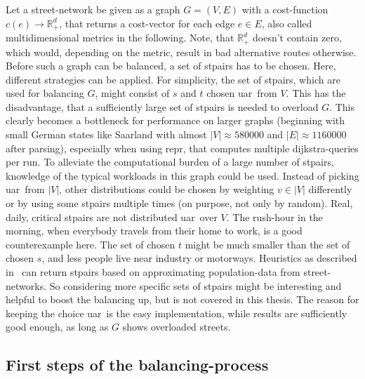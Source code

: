         Let a street-network be given as a graph $G = (V, E)$ with a cost-function $c(e) \rightarrow \mathbb{R}_+^d$, that returns a cost-vector for each edge $e \in E$, also called multidimensional \glspl{metric} in the following.
        Note, that $\mathbb{R}_+^d$ doesn't contain zero, which would, depending on the \gls{metric}, result in bad alternative routes otherwise.
        Before such a graph can be balanced, a set of \glspl{stpair} has to be chosen.
        Here, different strategies can be applied.
        For simplicity, the set of \glspl{stpair}, which are used for balancing $G$, might consist of $s$ and $t$ chosen \gls{uar}\ from $V$.
        This has the disadvantage, that a sufficiently large set of \glspl{stpair} is needed to overload $G$.
        This clearly becomes a bottleneck for performance on larger graphs (beginning with small German states like Saarland with almost $|V| \approx \num{580000}$ and $|E| \approx \num{1160000}$ after parsing), especially when using \gls{repr}, that computes multiple \gls{dijkstra}-queries per run.
        To alleviate the computational burden of a large number of \glspl{stpair}, knowledge of the typical workloads in this graph could be used.
        Instead of picking \gls{uar}\ from $|V|$, other distributions could be chosen by weighting $v \in |V|$ differently or by using some \glspl{stpair} multiple times (on purpose, not only by random).
        Real, daily, critical \glspl{stpair} are not distributed \gls{uar}\ over $V$.
        The rush-hour in the morning, when everybody travels from their home to work, is a good counterexample here.
        The set of chosen $t$ might be much smaller than the set of chosen $s$, and less people live near industry or motorways.
        Heuristics as described in~\cite{bakillah:population_from_osm} can return \glspl{stpair} based on approximating population-data from street-networks.
        So considering more specific sets of \glspl{stpair} might be interesting and helpful to boost the \gls{balancing} up, but is not covered in this thesis.
        The reason for keeping the choice \gls{uar}\ is the easy implementation, while results are sufficiently good enough, as long as $G$ shows overloaded streets.

    \subsection{First steps of the balancing-process}


